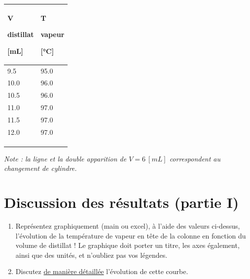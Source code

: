 \documentclass[11pt]{article}
\begin{document}
\begin{table}[H]
\begin{minipage}{0.33\textwidth}
\begin{tabular}{l:l}
\hline
V\begin{tiny}distillat\end{tiny} [mL] & T\begin{tiny}vapeur\end{tiny} [°C]\\
\hline
{}9.5 & 95.0 \\  
10.0 & 96.0 \\  
10.5 & 96.0 \\  
11.0 & 97.0 \\  
11.5 & 97.0 \\  
12.0 & 97.0 \\
 & \\
 & \\ 
 & \\
\hline
\end{tabular}
\end{minipage}
\end{table}
\textit{Note : la ligne et la double apparition de $V = 6 \: [mL]$ correspondent au changement de cylindre.}

\section*{Discussion des résultats (partie I)}
\begin{enumerate}
\item Représentez  graphiquement  (main  ou  excel),  à  l'aide  des  valeurs  ci-dessus,  l'évolution  de  la température de vapeur en tête de la colonne en fonction du volume de distillat ! Le graphique doit porter un titre, les axes également, ainsi que des unités, et n'oubliez pas vos légendes.
\item Discutez \underline{de manière détaillée} l'évolution de cette courbe.
\end{enumerate}
\end{document}
